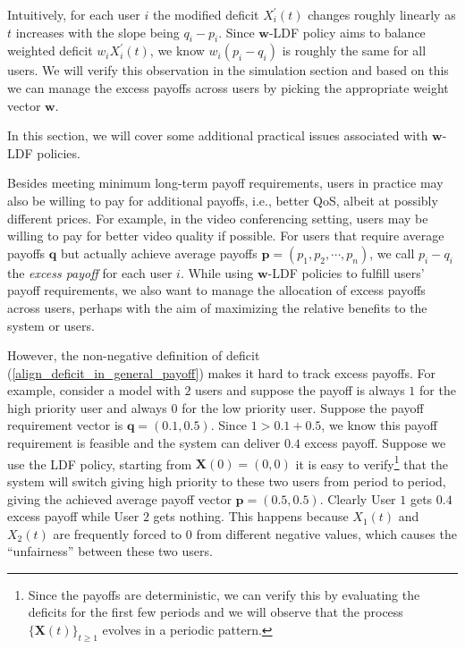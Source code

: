 \documentclass[prodmode,acmtompecs]{acmsmall}
\newcommand{\reqvec}{\mathbf{q}}
\newcommand{\reqscalar}{q}
\newcommand{\myComments}[1]{}
\newif\ifdissertation
\newcommand{\dissertationStart}{\ifdissertation  \myComments{Dissertation version: }}
\begin{document}
Intuitively, for each user $i$ the modified deficit $X_i^\prime(t)$ changes roughly linearly as $t$ increases with the slope being $\reqscalar_i - p_i$. Since $\mathbf{w}$-LDF policy aims to balance weighted deficit $w_iX_i^\prime(t)$, we know $w_i(p_i - \reqscalar_i)$ is roughly the same for all users.
We will verify this observation in the simulation section and based on this we can manage the excess payoffs across users by picking the appropriate weight vector $\mathbf{w}$. 

\dissertationStart
In this section, we will cover some additional practical issues associated with $\mathbf{w}$-LDF policies.  

Besides meeting minimum long-term payoff requirements, users in practice may also be willing to pay for additional payoffs, i.e., better QoS, albeit at possibly different prices. 
For example, in the video conferencing setting, users may be willing to pay for better video quality if possible. 
For users that require average payoffs $\reqvec$ but actually achieve average payoffs $\mathbf{p} = (p_1, p_2, \cdots, p_n)$, we call $p_i - \reqscalar_i$ the {\em excess payoff} for each user $i$. While using $\mathbf{w}$-LDF policies to fulfill users' payoff requirements, we also want to manage the allocation of excess payoffs across users, perhaps with the aim of maximizing the relative benefits to the system or users. 

However, the non-negative definition of deficit (\ref{align_deficit_in_general_payoff}) makes it hard to track excess payoffs. For example, consider a model with $2$ users and suppose the payoff is always $1$ for the high priority user and always $0$ for the low priority user. 
Suppose the payoff requirement vector is $\reqvec = (0.1, 0.5)$. Since $1 > 0.1 + 0.5$, we know this payoff requirement is feasible and the system can deliver $0.4$ excess payoff. 
Suppose we use the LDF policy, starting from $\mathbf{X}(0) = (0, 0)$ it is easy to verify\footnote{Since the payoffs are deterministic, we can verify this by evaluating the deficits for the first few periods and we will observe that the process $\{\mathbf{X}(t)\}_{t\geq 1}$ evolves in a periodic pattern. } that the system will switch giving high priority to these two users from period to period, giving the achieved average payoff vector $\mathbf{p} = (0.5, 0.5)$. Clearly User $1$ gets $0.4$ excess payoff while User $2$ gets nothing. 
This happens because $X_1(t)$ and $X_2(t)$ are frequently forced to $0$ from different negative values, which causes the ``unfairness'' between these two users. 
\end{document}
